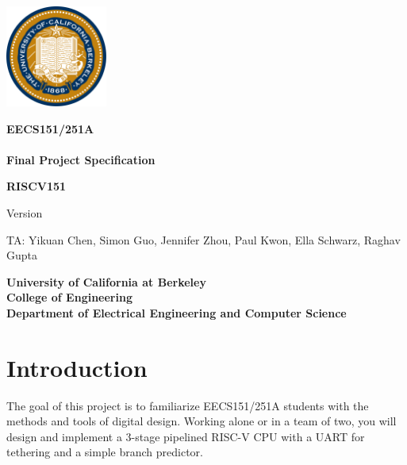 \documentclass[11pt]{article}
\begin{document}
\clearpage
\thispagestyle{empty}

\begin{center}
\includegraphics[width=0.25\textwidth]{images/Seal_of_University_of_California_Berkeley.png}
\end{center}
\begin{center}
\LARGE{
\color{gray}
\bf EECS151/251A \\
\currentSemester\\
Final Project Specification\\
}
\end{center}

\vfill


\begin{center}
\color{berkeleyblue}
\Huge
{\bf RISCV151 }  \\
\end{center}

\vfill

\begin{center}
\LARGE{
\color{gray}
Version \projectSpecVersion\\}
\end{center}

\vspace{3mm}

\begin{center}
\large{
TA: Yikuan Chen, Simon Guo, Jennifer Zhou, Paul Kwon, Ella Schwarz, Raghav Gupta}
\end{center}

\begin{center}
\large{
\bf
University of California at Berkeley \\
College of Engineering \\
Department of Electrical Engineering and Computer Science \\
}
\end{center}

\newpage
{}
\tableofcontents

\newpage

\section{Introduction}
The goal of this project is to familiarize EECS151/251A students with the methods and tools of digital design.
Working alone or in a team of two, you will design and implement a 3-stage pipelined RISC-V CPU with a UART for tethering and a simple branch predictor.
\end{document}
